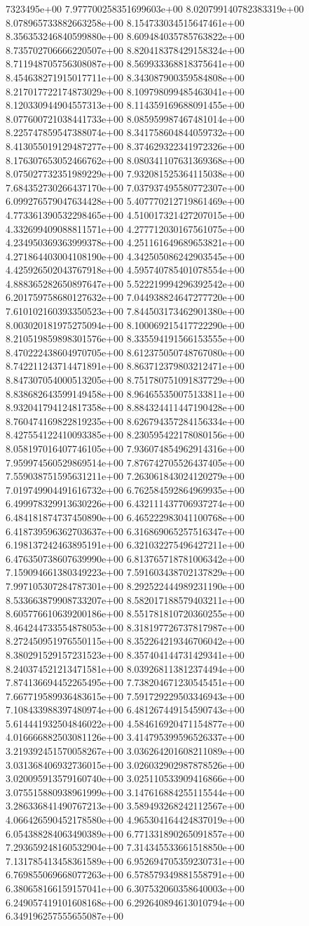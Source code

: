 7323495e+00	7.977700258351699603e+00	8.020799140782383319e+00	8.078965733882663258e+00	8.154733034515647461e+00	8.356353246840599880e+00	8.609484035785763822e+00	8.735702706666220507e+00	8.820418378429158324e+00	8.711948705756308087e+00	8.569933368818375641e+00	8.454638271915017711e+00	8.343087900359584808e+00	8.217017722174873029e+00	8.109798099485463041e+00	8.120330944904557313e+00	8.114359169688091455e+00	8.077600721038441733e+00	8.085959987467481014e+00	8.225747859547388074e+00	8.341758604844059732e+00	8.413055019129487277e+00	8.374629322341972326e+00	8.176307653052466762e+00	8.080341107631369368e+00	8.075027732351989229e+00	7.932081525364115038e+00	7.684352730266437170e+00	7.037937495580772307e+00	6.099276579047634428e+00	5.407770212719861469e+00	4.773361390532298465e+00	4.510017321427207015e+00	4.332699409088811571e+00	4.277712030167561075e+00	4.234950369363999378e+00	4.251161649689653821e+00	4.271864403004108190e+00	4.342505086242903545e+00	4.425926502043767918e+00	4.595740785401078554e+00	4.888365282650897647e+00	5.522219994296392542e+00	6.201759758680127632e+00	7.044938824647277720e+00	7.610102160393350523e+00	7.844503173462901380e+00	8.003020181975275094e+00	8.100069215417722290e+00	8.210519859898301576e+00	8.335594191566153555e+00	8.470222438604970705e+00	8.612375050748767080e+00	8.742211243714471891e+00	8.863712379803212471e+00	8.847307054000513205e+00	8.751780751091837729e+00	8.838682643599149458e+00	8.964655350075133811e+00	8.932041794124817358e+00	8.884324411447190428e+00	8.760474169822819235e+00	8.626794357284156334e+00	8.427554122410093385e+00	8.230595422178080156e+00	8.058197016407746105e+00	7.936074854962914316e+00	7.959974560529869514e+00	7.876742705526437405e+00	7.559038751595631211e+00	7.263061843024120279e+00	7.019749904491616732e+00	6.762584592864969935e+00	6.499978329913630226e+00	6.432111437706937274e+00	6.484181874737450890e+00	6.465222983041100768e+00	6.418739596362703637e+00	6.316869065257516347e+00	6.198137242463895191e+00	6.321032275496427211e+00	6.476350738607639990e+00	6.813765718781006342e+00	7.159094661380349223e+00	7.591603438702137829e+00	7.997105307284787301e+00	8.292522444989231190e+00	8.533663879908733207e+00	8.582017188579403211e+00	8.605776610639200186e+00	8.551781810720360255e+00	8.464244733554878053e+00	8.318197726737817987e+00	8.272450951976550115e+00	8.352264219346706042e+00	8.380291529157231523e+00	8.357404144731429341e+00	8.240374521213471581e+00	8.039268113812374494e+00	7.874136694452265495e+00	7.738204671230545451e+00	7.667719589936483615e+00	7.591729229503346943e+00	7.108433988397480974e+00	6.481267449154590743e+00	5.614441932504846022e+00	4.584616920471154877e+00	4.016666882503081126e+00	3.414795399596526337e+00	3.219392451570058267e+00	3.036264201608211089e+00	3.031368406932736015e+00	3.026032902987878526e+00	3.020095913579160740e+00	3.025110533909416866e+00	3.075515880938961999e+00	3.147616884255115544e+00	3.286336841490767213e+00	3.589493268242112567e+00	4.066426590452178580e+00	4.965304164424837019e+00	6.054388284063490389e+00	6.771331890265091857e+00	7.293659248160532904e+00	7.314345533661518850e+00	7.131785413458361589e+00	6.952694705359230731e+00	6.769855069668077263e+00	6.578579349881558791e+00	6.380658166159157041e+00	6.307532060358640003e+00	6.249057419101608168e+00	6.292640894613010794e+00	6.349196257555655087e+00